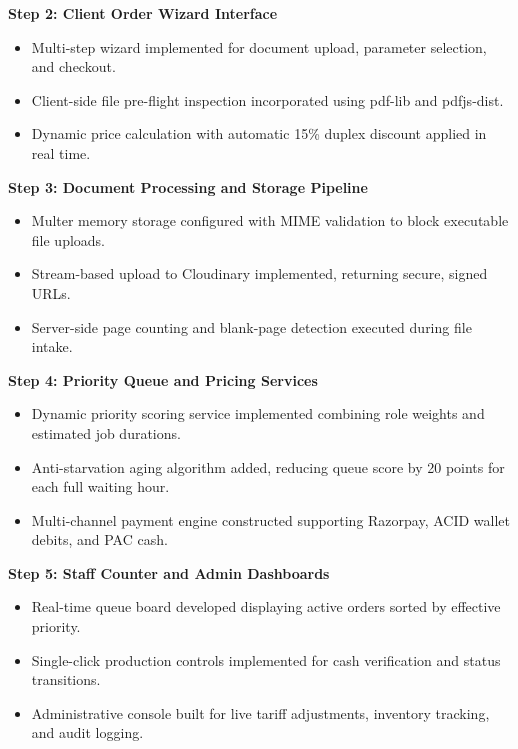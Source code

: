 \documentclass[12pt,a4paper]{report}
\begin{document}
\noindent\textbf{Step 2: Client Order Wizard Interface}
\begin{itemize}[leftmargin=0.35in, itemsep=1pt]
  \item Multi-step wizard implemented for document upload, parameter selection, and checkout.
  \item Client-side file pre-flight inspection incorporated using pdf-lib and pdfjs-dist.
  \item Dynamic price calculation with automatic 15\% duplex discount applied in real time.
\end{itemize}

\noindent\textbf{Step 3: Document Processing and Storage Pipeline}
\begin{itemize}[leftmargin=0.35in, itemsep=1pt]
  \item Multer memory storage configured with MIME validation to block executable file uploads.
  \item Stream-based upload to Cloudinary implemented, returning secure, signed URLs.
  \item Server-side page counting and blank-page detection executed during file intake.
\end{itemize}

\noindent\textbf{Step 4: Priority Queue and Pricing Services}
\begin{itemize}[leftmargin=0.35in, itemsep=1pt]
  \item Dynamic priority scoring service implemented combining role weights and estimated job durations.
  \item Anti-starvation aging algorithm added, reducing queue score by 20 points for each full waiting hour.
  \item Multi-channel payment engine constructed supporting Razorpay, ACID wallet debits, and PAC cash.
\end{itemize}

\noindent\textbf{Step 5: Staff Counter and Admin Dashboards}
\begin{itemize}[leftmargin=0.35in, itemsep=1pt]
  \item Real-time queue board developed displaying active orders sorted by effective priority.
  \item Single-click production controls implemented for cash verification and status transitions.
  \item Administrative console built for live tariff adjustments, inventory tracking, and audit logging.
\end{itemize}
\end{document}
